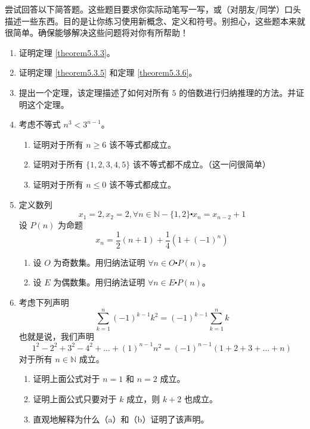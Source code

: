 尝试回答以下简答题。这些题目要求你实际动笔写一写，或（对朋友/同学）口头描述一些东西。目的是让你练习使用新概念、定义和符号。别担心，这些题本来就很简单。确保能够解决这些问题将对你有所帮助！

\begin{enumerate}[label=(\arabic*)]
    \item 证明定理 \ref{theorem5.3.3}。 \label{exc:exercises5.3.1}
    \item 证明定理 \ref{theorem5.3.5} 和定理 \ref{theorem5.3.6}。 \label{exc:exercises5.3.2}
    \item 提出一个定理，该定理描述了如何对所有 $5$ 的倍数进行归纳推理的方法。并证明这个定理。
    \item 考虑不等式 $n^3 < 3^{n-1}$。
        \begin{enumerate}[label=(\alph*)]
            \item 证明对于所有 $n \ge 6$ 该不等式都成立。
            \item 证明对于所有 $\{1,2,3,4,5\}$ 该不等式都不成立。（这一问很简单）
            \item 证明对于所有 $n \le 0$ 该不等式都成立。
        \end{enumerate}
    \item 定义数列
        \[x_1 = 2, x_2 = 2, \forall n \in \mathbb{N} - \{1, 2\} \centerdot x_n = x_{n-2} + 1\]
        设 $P(n)$ 为命题
        \[x_n = \frac{1}{2}(n+1)+\frac{1}{4}(1+(-1)^n)\]
        \begin{enumerate}[label=(\alph*)]
            \item 设 $O$ 为奇数集。用归纳法证明 $\forall n \in O \centerdot P(n)$。
            \item 设 $E$ 为偶数集。用归纳法证明 $\forall n \in E \centerdot P(n)$。
        \end{enumerate}
    \item 考虑下列声明
        \[\sum_{k=1}^{n} (-1)^{k-1}k^2 = (-1)^{k-1}\sum_{k=1}^{n} k\]
        也就是说，我们声明
        \[1^2 - 2^2 + 3^2 - 4^2 + \dots + (1)^{n-1}n^2 = (-1)^{n-1}(1 + 2 + 3 + \dots + n)\]
        对于所有 $n \in \mathbb{N}$ 成立。
        \begin{enumerate}[label=(\alph*)]
            \item 证明上面公式对于 $n=1$ 和 $n=2$ 成立。
            \item 证明上面公式只要对于 $k$ 成立，则 $k+2$ 也成立。
            \item 直观地解释为什么（a）和（b）证明了该声明。
        \end{enumerate}
\end{enumerate}
